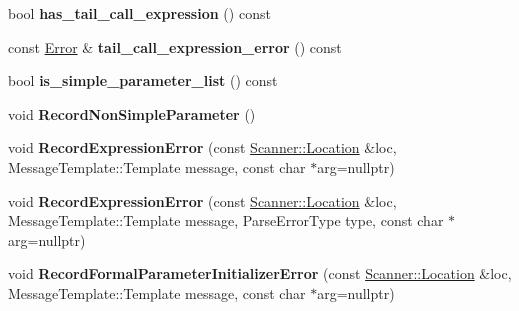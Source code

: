 \begin{DoxyCompactItemize}
\item 
bool {\bfseries has\+\_\+tail\+\_\+call\+\_\+expression} () const \hypertarget{classv8_1_1internal_1_1_expression_classifier_aa5dcd60f1353a8148617d04c18238c13}{}\label{classv8_1_1internal_1_1_expression_classifier_aa5dcd60f1353a8148617d04c18238c13}

\item 
const \hyperlink{structv8_1_1internal_1_1_expression_classifier_1_1_error}{Error} \& {\bfseries tail\+\_\+call\+\_\+expression\+\_\+error} () const \hypertarget{classv8_1_1internal_1_1_expression_classifier_affd7bafdfe579f4ee51b2db4203911d1}{}\label{classv8_1_1internal_1_1_expression_classifier_affd7bafdfe579f4ee51b2db4203911d1}

\item 
bool {\bfseries is\+\_\+simple\+\_\+parameter\+\_\+list} () const \hypertarget{classv8_1_1internal_1_1_expression_classifier_a1fdb12f5dbcce9487058c7a057d931b2}{}\label{classv8_1_1internal_1_1_expression_classifier_a1fdb12f5dbcce9487058c7a057d931b2}

\item 
void {\bfseries Record\+Non\+Simple\+Parameter} ()\hypertarget{classv8_1_1internal_1_1_expression_classifier_a25935246baab7e9193e8b0de436f8b37}{}\label{classv8_1_1internal_1_1_expression_classifier_a25935246baab7e9193e8b0de436f8b37}

\item 
void {\bfseries Record\+Expression\+Error} (const \hyperlink{structv8_1_1internal_1_1_scanner_1_1_location}{Scanner\+::\+Location} \&loc, Message\+Template\+::\+Template message, const char $\ast$arg=nullptr)\hypertarget{classv8_1_1internal_1_1_expression_classifier_a72c2beb2c2201b4c801b9c07491bd78c}{}\label{classv8_1_1internal_1_1_expression_classifier_a72c2beb2c2201b4c801b9c07491bd78c}

\item 
void {\bfseries Record\+Expression\+Error} (const \hyperlink{structv8_1_1internal_1_1_scanner_1_1_location}{Scanner\+::\+Location} \&loc, Message\+Template\+::\+Template message, Parse\+Error\+Type type, const char $\ast$arg=nullptr)\hypertarget{classv8_1_1internal_1_1_expression_classifier_aea5d488539d5c1e67d9994c29f28bae9}{}\label{classv8_1_1internal_1_1_expression_classifier_aea5d488539d5c1e67d9994c29f28bae9}

\item 
void {\bfseries Record\+Formal\+Parameter\+Initializer\+Error} (const \hyperlink{structv8_1_1internal_1_1_scanner_1_1_location}{Scanner\+::\+Location} \&loc, Message\+Template\+::\+Template message, const char $\ast$arg=nullptr)\hypertarget{classv8_1_1internal_1_1_expression_classifier_a3fa9b3b972dcefea4ceace4661c98417}{}\label{classv8_1_1internal_1_1_expression_classifier_a3fa9b3b972dcefea4ceace4661c98417}


\end{DoxyCompactItemize}
